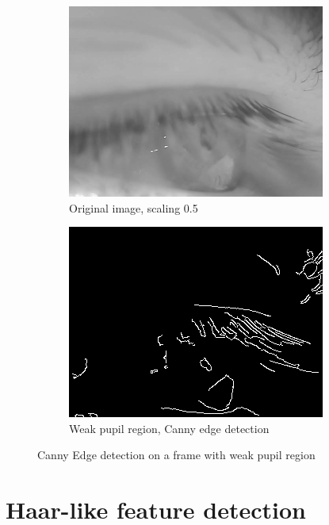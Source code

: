 \begin{figure}[ht]
    \centering
    \begin{subfigure}{.5\textwidth}
      \centering
      \includegraphics[width=.9\linewidth]{plots/orig_canny_eyelids.png}
      \caption{Original image, scaling 0.5}

    \end{subfigure}%
    \begin{subfigure}{.5\textwidth}
      \centering
      \includegraphics[width=.9\linewidth]{plots/canny_eyelids.png}
      \caption{Weak pupil region, Canny edge detection}

    \end{subfigure}
    \caption{Canny Edge detection on a frame with weak pupil region}
    \label{fig:canny_eyelid}
\end{figure}

\section{Haar-like feature detection }
\label{subsec:haar}
